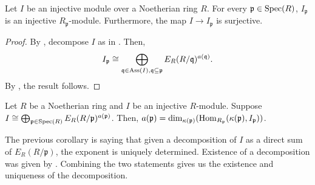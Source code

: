\begin{cor}
	Let $I$ be an injective module over a Noetherian ring $R$. For every $\mathfrak{p} \in \operatorname{Spec}(R)$, $I_{\mathfrak{p}}$ is an injective $R_{\mathfrak{p}}$-module. Furthermore, the map $I \to I_{\mathfrak{p}}$ is surjective.
\end{cor}
\begin{proof} 
	By , decompose $I$ as in . Then,
	\begin{equation*} 
		I_{\mathfrak{p}} \cong \bigoplus_{\mathfrak{q} \in \operatorname{Ass}(I), \mathfrak{q} \subseteq \mathfrak{p}} E_{R}(R/\mathfrak{q})^{a(\mathfrak{q})}.
	\end{equation*}
	By , the result follows.
\end{proof}

\begin{cor}
	Let $R$ be a Noetherian ring and $I$ be an injective $R$-module. Suppose $I \cong \bigoplus_{\mathfrak{p} \in \operatorname{Spec}(R)} E_{R}(R/\mathfrak{p})^{a(\mathfrak{p})}$. Then, $a(\mathfrak{p}) = \dim_{\kappa(\mathfrak{p})}(\operatorname{Hom}_{R_{\mathfrak{p}}}(\kappa(\mathfrak{p}), I_{\mathfrak{p}}))$. 
\end{cor}

\begin{rem}
	The previous corollary is saying that given a decomposition of $I$ as a direct sum of $E_{R}(R/\mathfrak{p})$, the exponent is uniquely determined. Existence of a decomposition was given by . Combining the two statements gives us the existence and uniqueness of the decomposition.
\end{rem}